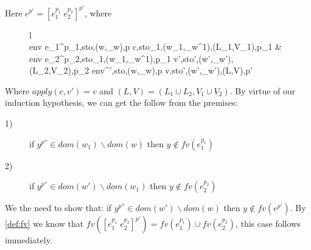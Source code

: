 \item[\runa{App-const}] Here $e^{p'}=[e_1^{p_1}\;e_2^{p_2}]^{p'}$, where
\begin{figure}[H]
	\setlength\tabcolsep{8pt}
	\begin{tabular}{l}
		\InfName{App-const}\\[0.2cm]
		\inference[]
				{env \vdash \left\langle e_1^{p_1},sto,(w,\sqsubseteq_w),p \right\rangle \rightarrow \left\langle c,sto_1,(w_1,\sqsubseteq_w^1),(L_1,V_1),p_1 \right\rangle &\\
				env \vdash \left\langle e_2^{p_2},sto_1,(w_1,\sqsubseteq_w^1),p_1 \right\rangle \rightarrow \left\langle v',sto',(w',\sqsubseteq_w'),(L_2,V_2),p_2 \right\rangle}
				{env\vdash \left\langle \left[e_1^{p_1}\;e_2^{p_2}\right]^{'},sto,(w,\sqsubseteq_w),p \right\rangle \rightarrow \left\langle v,sto',(w',\sqsubseteq_w'),(L,V),p' \right\rangle}
	\end{tabular}
\end{figure}
Where $apply(c,v')=v$ and $(L,V)=(L_1\cup L_2,V_1\cup V_2)$.
By virtue of our induction hypothesis, we can get the follow from the premises:
\begin{description}
	\item[1)] if $y^{p''}\in dom(w_1)\backslash dom(w)$ then $y\notin fv(e_1^{p_1})$
	\item[2)] if $y^{p''}\in dom(w')\backslash dom(w_1)$ then $y\notin fv(e_2^{p_2})$
\end{description}
We the need to show that: if $y^{p''}\in dom(w')\backslash dom(w)$ then $y\notin fv(e^{p'})$.
By \cref{def:fv} we know that $fv([e_1^{p_1}\;e_2^{p_2}]^{p'})=fv(e_1^{p_1})\cup fv(e_2^{p_2})$, this case follows immediately.
